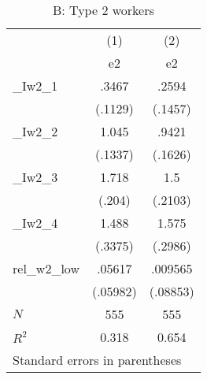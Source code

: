 \begin{table}[htbp]\centering
\caption{B: Type 2 workers}
\begin{tabular}{l*{2}{c}}
\hline\hline
            &\multicolumn{1}{c}{(1)}&\multicolumn{1}{c}{(2)}\\
            &\multicolumn{1}{c}{e2}&\multicolumn{1}{c}{e2}\\
\hline
\_Iw2\_1      &       .3467&       .2594\\
            &     (.1129)&     (.1457)\\
[1em]
\_Iw2\_2      &       1.045&       .9421\\
            &     (.1337)&     (.1626)\\
[1em]
\_Iw2\_3      &       1.718&         1.5\\
            &      (.204)&     (.2103)\\
[1em]
\_Iw2\_4      &       1.488&       1.575\\
            &     (.3375)&     (.2986)\\
[1em]
rel\_w2\_low  &      .05617&     .009565\\
            &    (.05982)&    (.08853)\\
\hline
\(N\)       &         555&         555\\
\(R^{2}\)   &       0.318&       0.654\\
\hline\hline
\multicolumn{3}{l}{\footnotesize Standard errors in parentheses}\\
\end{tabular}
\end{table}
